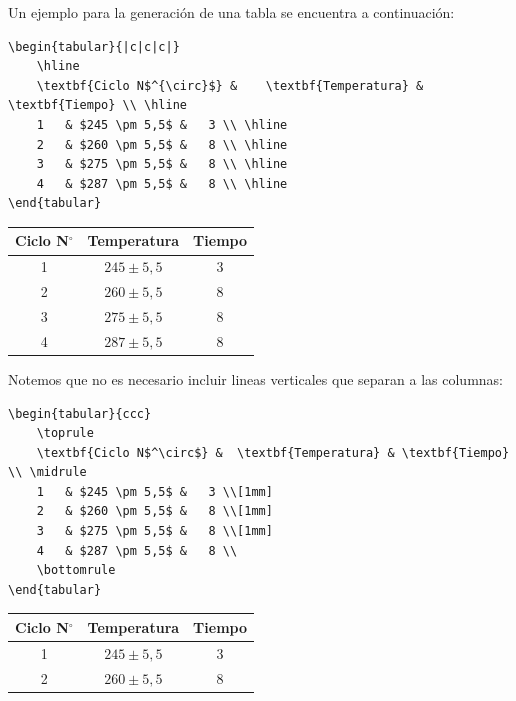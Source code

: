 \documentclass[a4,10pt]{aleph-notas}
\begin{document}
Un ejemplo para la generación de una tabla se encuentra a continuación:

\begin{lstlisting}[frame=single]
\begin{tabular}{|c|c|c|}
    \hline
    \textbf{Ciclo N$^{\circ}$} &	\textbf{Temperatura} & \textbf{Tiempo} \\ \hline
    1   & $245 \pm 5,5$ &	3 \\ \hline
    2	& $260 \pm 5,5$ &	8 \\ \hline
    3	& $275 \pm 5,5$ &	8 \\ \hline
    4	& $287 \pm 5,5$ &	8 \\ \hline
\end{tabular}
\end{lstlisting}

\begin{center}
  \begin{tabular}{|c|c|c|}
   \hline
    \textbf{Ciclo N$^{\circ}$} &	\textbf{Temperatura} & \textbf{Tiempo} \\ \hline
    1   & $245 \pm 5,5$ &	3 \\ \hline
    2	& $260 \pm 5,5$ &	8 \\ \hline
    3	& $275 \pm 5,5$ &	8 \\ \hline
    4	& $287 \pm 5,5$ &	8 \\ \hline
  \end{tabular}
\end{center}

Notemos que no es necesario incluir lineas verticales que separan a las columnas:

\begin{lstlisting}[frame=single]
\begin{tabular}{ccc}
    \toprule
    \textbf{Ciclo N$^\circ$} &	\textbf{Temperatura} & \textbf{Tiempo} \\ \midrule
    1   & $245 \pm 5,5$ &	3 \\[1mm]
    2	& $260 \pm 5,5$ &	8 \\[1mm]
    3	& $275 \pm 5,5$ &	8 \\[1mm]
    4	& $287 \pm 5,5$ &	8 \\
    \bottomrule
\end{tabular}
\end{lstlisting}


\begin{center}
  \begin{tabular}{|cc|c|}
   \hline
    \textbf{Ciclo N$^\circ$} &	\textbf{Temperatura} & \textbf{Tiempo} \\ \hline
    1   & $245 \pm 5,5$ &	3 \\
    2	& $260 \pm 5,5$ &	8 \\
    \hline
  \end{tabular}
\end{center}
\end{document}

